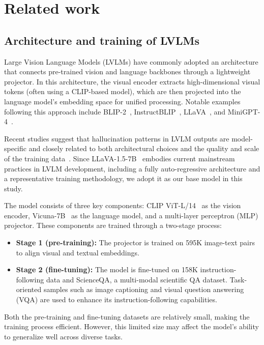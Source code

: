 \section{Related work}
\label{sec-relatedwork}

\subsection{Architecture and training of LVLMs}\label{subsec-training}
Large Vision Language Models (LVLMs) have commonly adopted an architecture that connects pre-trained vision and language backbones through a lightweight projector. In this architecture, the visual encoder extracts high-dimensional visual tokens (often using a CLIP-based model), which are then projected into the language model's embedding space for unified processing. Notable examples following this approach include BLIP-2~\cite{li2023blip}, InstructBLIP~\cite{dai2023instructblip}, LLaVA~\cite{liu2024visual, liu2024improved}, and MiniGPT-4~\cite{zhu2023minigpt}.

Recent studies suggest that hallucination patterns in LVLM outputs are model-specific and closely related to both architectural choices and the quality and scale of the training data~\cite{liu2024survey, gunjal2024detecting}. Since LLaVA-1.5-7B~\cite{liu2024improved} embodies current mainstream practices in LVLM development, including a fully auto-regressive architecture and a representative training methodology, we adopt it as our base model in this study.

The model consists of three key components: CLIP ViT-L/14~\cite{radford2021learning} as the vision encoder, Vicuna-7B~\cite{vicuna2023} as the language model, and a multi-layer perceptron (MLP) projector. These components are trained through a two-stage process:

\begin{itemize}
    \item \textbf{Stage 1 (pre-training):} The projector is trained on 595K image-text pairs to align visual and textual embeddings.
    \item \textbf{Stage 2 (fine-tuning):} The model is fine-tuned on 158K instruction-following data and ScienceQA, a multi-modal scientific QA dataset. Task-oriented samples such as image captioning and visual question answering (VQA) are used to enhance its instruction-following capabilities.
\end{itemize}

Both the pre-training and fine-tuning datasets are relatively small, making the training process efficient. However, this limited size may affect the model's ability to generalize well across diverse tasks.

